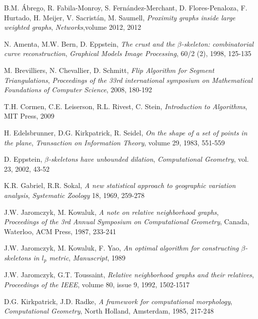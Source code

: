 \documentclass[11pt]{llncs}
\begin{document}

\begin{thebibliography}{99999}

B.M. Ábrego, R. Fabila-Monroy, S. Fernández-Merchant, D. Flores-Penaloza, 
F. Hurtado, H. Meijer, V. Sacristán, M. Saumell, 
\textit{Proximity graphs inside large weighted graphs}, 
\textit{Networks},volume 2012, 2012

N. Amenta, M.W. Bern, D. Eppstein, 
\textit{The crust and the $\beta$-skeleton: combinatorial curve reconstruction}, 
\textit{Graphical Models Image Processing}, 60/2 (2), 1998, 125-135

M. Brevilliers, N. Chevallier, D. Schmitt,
\textit{Flip Algorithm for Segment Triangulations},
\textit{Proceedings of the 33rd international symposium on Mathematical Foundations of Computer Science}, 2008, 180-192

T.H. Cormen, C.E. Leiserson, R.L. Rivest, C. Stein, 
\textit{Introduction to Algorithms}, 
MIT Press, 2009

H. Edelsbrunner, D.G. Kirkpatrick, R. Seidel, 
\textit{On the shape of a set of points in the plane}, 
\textit{Transaction on Information Theory}, volume 29, 1983, 551-559

D. Eppstein, 
\textit{$\beta$-skeletons have unbounded dilation}, 
\textit{Computational Geometry}, vol. 23, 2002, 43-52


K.R. Gabriel, R.R. Sokal, 
\textit{A new statistical approach to geographic variation analysis}, 
\textit{Systematic Zoology} 18, 1969, 259-278



J.W. Jaromczyk, M. Kowaluk, 
\textit{A note on relative neighborhood graphs}, 
\textit{Proceedings of the 3rd Annual Symposium on Computational Geometry}, Canada, Waterloo, 
ACM Press, 1987, 233-241 

J.W. Jaromczyk, M. Kowaluk, F. Yao, 
\textit{An optimal algorithm for constructing $\beta$-skeletons in $l_p$ metric},
 \textit{Manuscript}, 1989

J.W. Jaromczyk, G.T. Toussaint, 
\textit{Relative neighborhood graphs and their relatives}, 
\textit{Proceedings of the IEEE}, volume 80, issue 9, 1992, 1502-1517

D.G. Kirkpatrick, J.D. Radke, 
\textit{A framework for computational morphology}, 
\textit{Computational Geometry}, North Holland, Amsterdam, 1985, 217-248




\end{thebibliography}
\end{document}
